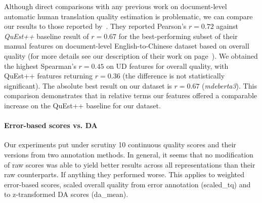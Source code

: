 Although direct comparisons with any previous work on document-level automatic human translation quality estimation is problematic, we can compare our results to those reported by~\cite{Yuan2018}. %
They reported Pearson's $r=0.72$ against \textit{QuEst++} baseline result of $r=0.67$ for the best-performing subset of their manual features on document-level English-to-Chinese dataset based on overall quality (for more details see our description of their work on page~\pageref{pg:yuan_previous}). %
We obtained the highest Spearman's $r=0.45$ on UD features for overall quality, with QuEst++ features returning $r=0.36$ (the difference is not statistically significant). The absolute best result on our dataset is $r=0.67$ (\textit{mdeberta3}). This comparison demonstrates that in relative terms our features offered a comparable increase on the QuEst++ baseline for our dataset. %


\paragraph{Error-based scores vs. DA}
Our experiments put under scrutiny 10 continuous quality scores and their versions from two annotation methods.
In general, it seems that no modification of raw scores was able to yield better results across all representations than their raw counterparts. If anything they performed worse. This applies to weighted error-based scores, scaled overall quality from error annotation (scaled\_tq) and to z-transformed DA scores (da\_mean).

